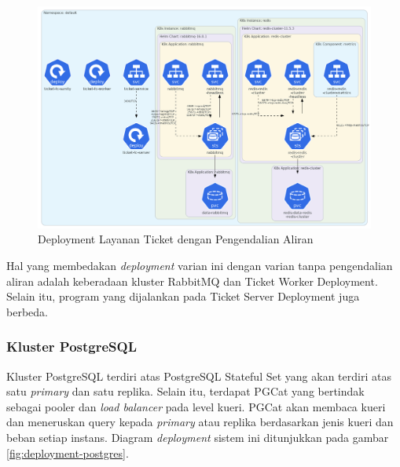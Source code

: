 \begin{figure}[htbp]
    \centering
    \includegraphics[width=1\textwidth]{resources/chapter-4/ticket-fc.png}
    \caption{Deployment Layanan Ticket dengan Pengendalian Aliran}
    \label{fig:deployment-ticket-fc}
\end{figure}

Hal yang membedakan \textit{deployment} varian ini dengan varian tanpa pengendalian aliran adalah keberadaan kluster RabbitMQ dan Ticket Worker Deployment. Selain itu, program yang dijalankan pada Ticket Server Deployment juga berbeda.

\pagebreak

\subsubsection{Kluster PostgreSQL}

Kluster PostgreSQL terdiri atas PostgreSQL Stateful Set yang akan terdiri atas satu \textit{primary} dan satu replika. Selain itu, terdapat PGCat yang bertindak sebagai pooler dan \textit{load balancer} pada level kueri. PGCat akan membaca kueri dan meneruskan query kepada \textit{primary} atau replika berdasarkan jenis kueri dan beban setiap instans. Diagram \textit{deployment} sistem ini ditunjukkan pada gambar \ref{fig:deployment-postgres}.

